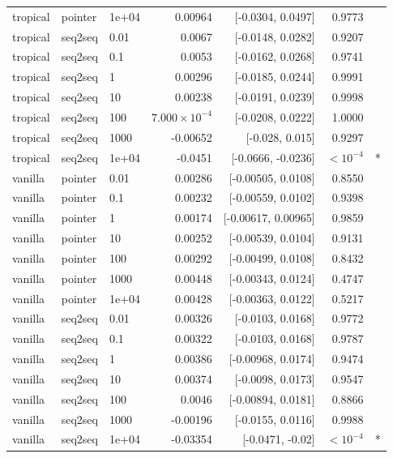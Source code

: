 \documentclass[10pt]{article}
\begin{document}
{\begin{longtable}{lllrrrl}
tropical & pointer & 1e+04 & 0.00964 & [-0.0304, 0.0497] & 0.9773 & \\
tropical & seq2seq & 0.01 & 0.0067 & [-0.0148, 0.0282] & 0.9207 & \\
tropical & seq2seq & 0.1 & 0.0053 & [-0.0162, 0.0268] & 0.9741 & \\
tropical & seq2seq & 1 & 0.00296 & [-0.0185, 0.0244] & 0.9991 & \\
tropical & seq2seq & 10 & 0.00238 & [-0.0191, 0.0239] & 0.9998 & \\
tropical & seq2seq & 100 & $7.000\times10^{-4}$ & [-0.0208, 0.0222] & 1.0000 & \\
tropical & seq2seq & 1000 & -0.00652 & [-0.028, 0.015] & 0.9297 & \\
tropical & seq2seq & 1e+04 & -0.0451 & [-0.0666, -0.0236] & $<10^{-4}$ & *\\
vanilla & pointer & 0.01 & 0.00286 & [-0.00505, 0.0108] & 0.8550 & \\
vanilla & pointer & 0.1 & 0.00232 & [-0.00559, 0.0102] & 0.9398 & \\
vanilla & pointer & 1 & 0.00174 & [-0.00617, 0.00965] & 0.9859 & \\
vanilla & pointer & 10 & 0.00252 & [-0.00539, 0.0104] & 0.9131 & \\
vanilla & pointer & 100 & 0.00292 & [-0.00499, 0.0108] & 0.8432 & \\
vanilla & pointer & 1000 & 0.00448 & [-0.00343, 0.0124] & 0.4747 & \\
vanilla & pointer & 1e+04 & 0.00428 & [-0.00363, 0.0122] & 0.5217 & \\
vanilla & seq2seq & 0.01 & 0.00326 & [-0.0103, 0.0168] & 0.9772 & \\
vanilla & seq2seq & 0.1 & 0.00322 & [-0.0103, 0.0168] & 0.9787 & \\
vanilla & seq2seq & 1 & 0.00386 & [-0.00968, 0.0174] & 0.9474 & \\
vanilla & seq2seq & 10 & 0.00374 & [-0.0098, 0.0173] & 0.9547 & \\
vanilla & seq2seq & 100 & 0.0046 & [-0.00894, 0.0181] & 0.8866 & \\
vanilla & seq2seq & 1000 & -0.00196 & [-0.0155, 0.0116] & 0.9988 & \\
vanilla & seq2seq & 1e+04 & -0.03354 & [-0.0471, -0.02] & $<10^{-4}$ & *\\
\bottomrule
\end{longtable}
}
\end{document}
